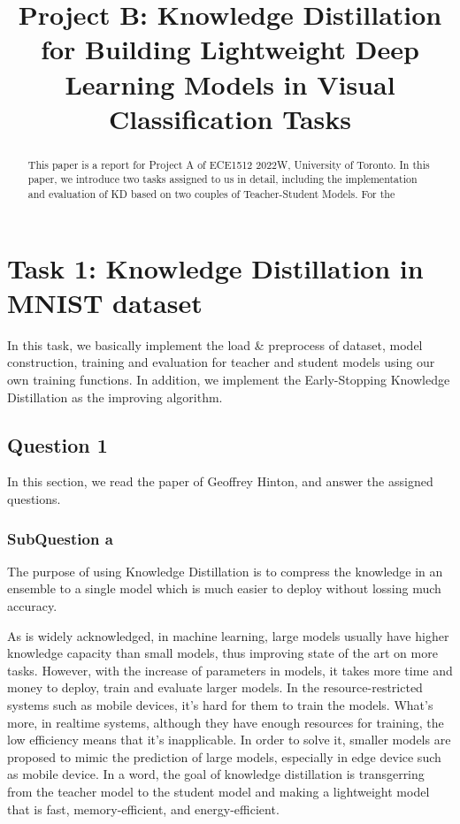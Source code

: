 \documentclass[conference]{IEEEtran}
\begin{document}
\title{Project B: Knowledge Distillation for Building Lightweight Deep Learning Models in Visual Classification Tasks
}
\maketitle

\begin{abstract}
This paper is a report for Project A of ECE1512 2022W, University of Toronto.
In this paper, we introduce two tasks assigned to us in detail, including the implementation and evaluation of KD based on two couples of Teacher-Student Models.
For the 
\end{abstract}

\section{Task 1: Knowledge Distillation in MNIST dataset}
In this task, we basically implement the load \& preprocess of dataset, model construction, training and evaluation for teacher and student models using our own training functions.
In addition, we implement the Early-Stopping Knowledge Distillation as the improving algorithm.
\subsection{Question 1}

In this section, we read the paper of Geoffrey Hinton\cite{b6}, and answer the assigned questions.

\subsubsection{SubQuestion a}
The purpose of using Knowledge Distillation is to compress the knowledge in an ensemble to a single model which is much easier to deploy without lossing much accuracy.\par
As is widely acknowledged, in machine learning, large models usually have higher knowledge capacity than small models, thus improving state of the art on more tasks. 
However, with the increase of parameters in models, it takes more time and money to deploy, train and evaluate larger models.
In the resource-restricted systems such as mobile devices, it's hard for them to train the models. What's more, in realtime systems, although they have enough resources for training, the low efficiency means that it's inapplicable.
In order to solve it, smaller models are proposed to mimic the prediction of large models, especially in edge device such as mobile device. In a word, the goal of knowledge distillation is transgerring from the teacher model to the student model and making a lightweight model that is fast, memory-efficient, and energy-efficient.
\end{document}
